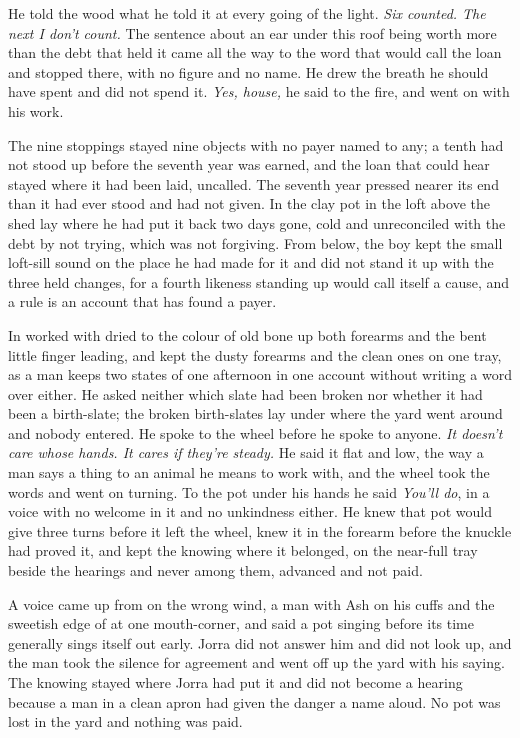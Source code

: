 He told the wood what he told it at every going of the light. \emph{Six counted. The next I don't count.} The sentence about an ear under this roof being worth more than the debt that held it came all the way to the word that would call the loan and stopped there, with no figure and no name. He drew the breath he should have spent and did not spend it. \emph{Yes, house,} he said to the fire, and went on with his work.

The nine stoppings stayed nine objects with no payer named to any; a tenth had not stood up before the seventh year was earned, and the loan that could hear stayed where it had been laid, uncalled. The seventh year pressed nearer its end than it had ever stood and had not given. In the clay pot in the loft above the shed  lay where he had put it back two days gone, cold and unreconciled with the debt by not trying, which was not forgiving. From below, the boy kept the small loft-sill sound on the place he had made for it and did not stand it up with the three held changes, for a fourth likeness standing up would call itself a cause, and a rule is an account that has found a payer.

\scenebreak

In   worked with  dried to the colour of old bone up both forearms and the bent little finger leading, and kept the dusty forearms and the clean ones on one tray, as a man keeps two states of one afternoon in one account without writing a word over either. He asked neither which slate had been broken nor whether it had been a birth-slate; the broken birth-slates lay under  where the yard went around and nobody entered. He spoke to the wheel before he spoke to anyone. \emph{It doesn't care whose hands. It cares if they're steady.} He said it flat and low, the way a man says a thing to an animal he means to work with, and the wheel took the words and went on turning. To the pot under his hands he said \emph{You'll do}, in a voice with no welcome in it and no unkindness either. He knew  that pot would give three turns before it left the wheel, knew it in the forearm before the knuckle had proved it, and kept the knowing where it belonged, on the near-full tray beside the hearings and never among them, advanced and not paid.

A voice came up from  on the wrong wind, a man with Ash on his cuffs and the sweetish edge of  at one mouth-corner, and said a pot singing before its time generally sings itself out early. Jorra did not answer him and did not look up, and the man took the silence for agreement and went off up the yard with his saying. The knowing stayed where Jorra had put it and did not become a hearing because a man in a clean apron had given the danger a name aloud. No pot was lost in the yard and nothing was paid.

